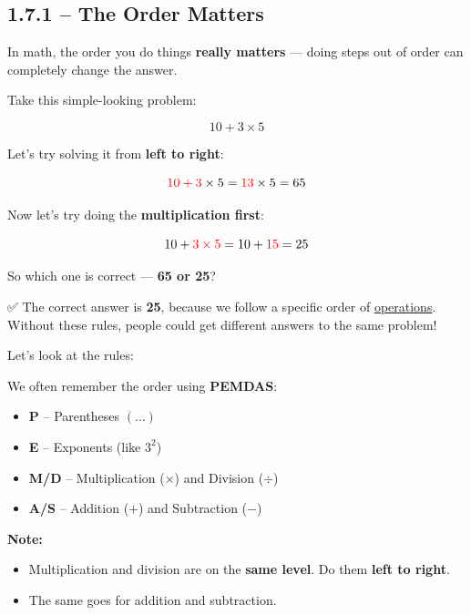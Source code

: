 \documentclass[
  letterpaper,
  DIV=11,
  numbers=noendperiod]{scrreprt}
\providecommand{\tightlist}{%
  \setlength{\itemsep}{0pt}\setlength{\parskip}{0pt}}
\begin{document}

\subsection*{1.7.1 -- The Order Matters}\label{the-order-matters}

In math, the order you do things \textbf{really matters} --- doing steps
out of order can completely change the answer.

Take this simple-looking problem:

\[
10 + 3 \times 5
\]

Let's try solving it from \textbf{left to right}:

\[
\color{red}10 + 3 \color{black}\times 5 = \color{red}13 \color{black}\times 5 = 65
\]

Now let's try doing the \textbf{multiplication first}:

\[
10 + \color{red}3 \times 5 \color{black} = 10 + \color{red}15 \color{black} = 25
\]

So which one is correct --- \textbf{65 or 25}?

✅ The correct answer is \textbf{25}, because we follow a specific order
of \href{./glossary.html\#glossary-operation}{operations}. Without these
rules, people could get different answers to the same problem!

Let's look at the rules:

We often remember the order using \textbf{PEMDAS}:

\begin{itemize}
\tightlist
\item
  \textbf{P} -- Parentheses \((...)\)
\item
  \textbf{E} -- Exponents (like \(3^2\))
\item
  \textbf{M/D} -- Multiplication (\(\times\)) and Division (\(\div\))
\item
  \textbf{A/S} -- Addition (\(+\)) and Subtraction (\(-\))
\end{itemize}

\textbf{Note:}

\begin{itemize}
\tightlist
\item
  Multiplication and division are on the \textbf{same level}. Do them
  \textbf{left to right}.
\item
  The same goes for addition and subtraction.
\end{itemize}
\end{document}
